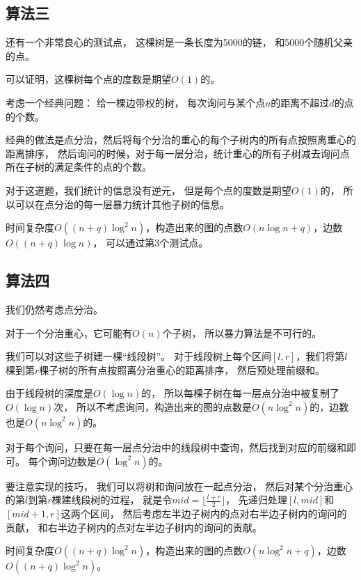\documentclass{noiassignment}
\begin{document}
\subsection{算法三}
还有一个非常良心的测试点，
这棵树是一条长度为5000的链，
和5000个随机父亲的点。

可以证明，这棵树每个点的度数是期望$O(1)$的。

考虑一个经典问题：
给一棵边带权的树，
每次询问与某个点$u$的距离不超过$d$的点的$\textbf{个数}$。

经典的做法是点分治，然后将每个分治的重心的每个子树内的所有点按照离重心的距离排序，
然后询问的时候，对于每一层分治，统计重心的所有子树减去询问点所在子树的满足条件的点的个数。

对于这道题，我们统计的信息没有逆元，
但是每个点的度数是期望$O(1)$的，
所以可以在点分治的每一层暴力统计其他子树的信息。

时间复杂度$O((n+q) \log ^ 2 n)$，构造出来的图的点数$O(n \log n + q)$，边数$O((n+q) \log n)$，
可以通过第3个测试点。








\subsection{算法四}
我们仍然考虑点分治。

对于一个分治重心，它可能有$O(n)$个子树，
所以暴力算法是不可行的。

我们可以对这些子树建一棵``线段树''。
对于线段树上每个区间$[l,r]$，我们将第$l$棵到第$r$棵子树的所有点按照离分治重心的距离排序，
然后预处理前缀和。

由于线段树的深度是$O(\log n)$的，
所以每棵子树在每一层点分治中被复制了$O(\log n)$次，
所以不考虑询问，构造出来的图的点数是$O(n \log ^ 2 n)$的，边数也是$O(n \log ^ 2 n)$的。

对于每个询问，只要在每一层点分治中的线段树中查询，然后找到对应的前缀和即可。
每个询问边数是$O(\log ^ 2 n)$的。

要注意实现的技巧，
我们可以将树和询问放在一起点分治，
然后对某个分治重心的第$l$到第$r$棵建线段树的过程，
就是令$mid = \lfloor \frac{l+r}{2} \rfloor$，
先递归处理$[l,mid]$和$[mid+1,r]$这两个区间，
然后考虑左半边子树内的点对右半边子树内的询问的贡献，
和右半边子树内的点对左半边子树内的询问的贡献。

时间复杂度$O((n+q) \log ^ 2 n)$，构造出来的图的点数$O(n \log ^ 2 n + q)$，边数$O((n+q) \log ^ 2 n)$。
\end{document}
